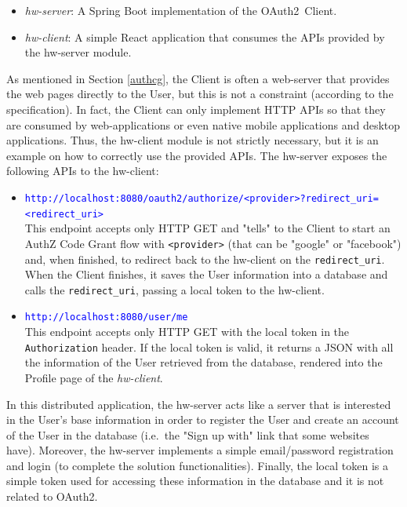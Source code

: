 \documentclass[a4paper,12pt]{article}
\def\ie{i.e.\xspace}
\def\oauth{OAuth2\xspace}
\begin{document}
\begin{itemize}
    \item \textit{hw-server}: A Spring Boot implementation of the \oauth\ Client.
    \item \textit{hw-client}: A simple React application that consumes the APIs provided by the hw-server module.
\end{itemize}

As mentioned in Section \ref{authcg}, the Client is often a web-server that provides the web pages directly to the User, but this is not a constraint (according to the specification). In fact, the Client can only implement HTTP APIs so that they are consumed by web-applications or even native mobile applications and desktop applications. Thus, the hw-client module is not strictly necessary, but it is an example on how to correctly use the provided APIs.
The hw-server exposes the following APIs to the hw-client:

\begin{itemize}
    \item \textcolor{blue}{\texttt{\small http://localhost:8080/oauth2/authorize/<provider>?redirect\_uri=<redirect\_uri>}}\\
    This endpoint accepts only HTTP GET and "tells" to the Client to start an AuthZ Code Grant flow with \texttt{<provider>} (that can be "google" or "facebook") and, when finished, to redirect back to the hw-client on the \texttt{redirect\_uri}. When the Client finishes, it saves the User information into a database and calls the \texttt{redirect\_uri}, passing a local token to the hw-client.
    
    \item \textcolor{blue}{\texttt{\small http://localhost:8080/user/me}}\\
    This endpoint accepts only HTTP GET with the local token in the \texttt{Authorization} header. If the local token is valid, it returns a JSON with all the information of the User retrieved from the database, rendered into the Profile page of the \textit{hw-client}.
\end{itemize}

In this distributed application, the hw-server acts like a server that is interested in the User's base information in order to register the User and create an account of the User in the database (\ie\ the "Sign up with" link that some websites have). Moreover, the hw-server implements a simple email/password registration and login (to complete the solution functionalities). Finally, the local token is a simple token used for accessing these information in the database and it is not related to \oauth.
\end{document}
